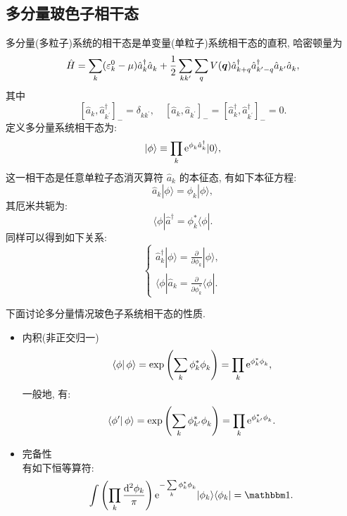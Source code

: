 \subsection{多分量玻色子相干态}
多分量(多粒子)系统的相干态是单变量(单粒子)系统相干态的直积, 哈密顿量为
\begin{equation}
\hat H=\sum_k(\varepsilon_k^0-\mu) \hat{a}_k^{\dagger} \hat{a}^{}_k + \frac{1}{2}\sum_{kk^\prime}\sum_{q}V(\boldsymbol{q})\hat{a}^{\dagger}_{k+q}\hat{a}^{\dagger}_{k^\prime-q}\hat{a}^{}_{k^\prime}\hat{a}^{}_{k},
\end{equation}
其中
\begin{equation}
\left[\hat{a}^{}_{k}, \hat{a}^{\dagger}_{k^\prime}\right]_{-}=\delta_{kk^\prime},\quad\left[\hat{a}^{}_{k}, \hat{a}^{}_{k^\prime}\right]_{-}=\left[\hat{a}_{k}^{\dagger}, \hat{a}_{k^\prime}^{\dagger}\right]_{-}=0.
\end{equation}
定义多分量系统相干态为:
\begin{equation}
|\phi\rangle \equiv \prod_{k} \mathrm{e}^{\phi^{}_{k} \hat{a}_{k}^{\dagger}}|0\rangle,
\end{equation}
这一相干态是任意单粒子态消灭算符 $\hat{a}_{k}$ 的本征态, 有如下本征方程:
\begin{equation}
\hat{a}_{k}|\phi\rangle=\phi_{k}|\phi\rangle,
\end{equation}
其厄米共轭为:
\begin{equation}
\langle\phi| \hat{a}^{\dagger}=\phi_{k}^{*}\langle\phi|.
\end{equation}
同样可以得到如下关系:
\begin{equation}
\left\{\begin{aligned}
\hat{a}_{k}^{\dagger}|\phi\rangle=\frac{\partial}{\partial \phi_{k}}|\phi\rangle, \\
\langle\phi| \hat{a}_{k}=\frac{\partial}{\partial \phi_{k}^{*}}\langle\phi| .
\end{aligned}\right.
\end{equation}

下面讨论多分量情况玻色子系统相干态的性质.
\begin{itemize}
\item 内积(非正交归一)
\begin{equation}
\left.\left\langle\phi \right|\phi\right\rangle=\exp \left(\sum_{k} \phi_{k}^{*} \phi^{}_{k}\right)=\prod_{k} \mathrm{e}^{\phi^{*}_{k} \phi^{}_{k}},
\end{equation}
一般地, 有:
\begin{equation}
\left.\left\langle\phi^{\prime} \right| \phi\right\rangle=\exp \left(\sum_{k} \phi_{{k}^{\prime}}^{*} \phi^{}_{k}\right)=\prod_{k} \mathrm{e}^{\phi^{*}_{k^{\prime}} \phi^{}_{k}}.
\end{equation}

\item 完备性\\
有如下恒等算符:
\begin{equation}
\int\left(\prod_{k} \frac{\mathrm{d}^{2} \phi_{k}}{\pi}\right) \e^{-\sum\limits_{k} \phi_{k}^{*} \phi^{}_{k}}|\phi_k\rangle\langle\phi_k|=\mathbbm 1 .
\end{equation}
\end{itemize}

